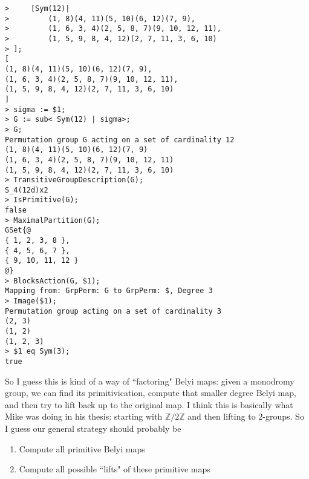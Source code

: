 \documentclass[reqno, 12pt]{amsart}
\theoremstyle{definition}
\theoremstyle{remark}
\newcommand{\Z}{\mathbb Z}
\begin{document}
\begin{lstlisting}
>     [Sym(12)|
>         (1, 8)(4, 11)(5, 10)(6, 12)(7, 9),
>         (1, 6, 3, 4)(2, 5, 8, 7)(9, 10, 12, 11),
>         (1, 5, 9, 8, 4, 12)(2, 7, 11, 3, 6, 10)
> ];
[
(1, 8)(4, 11)(5, 10)(6, 12)(7, 9),
(1, 6, 3, 4)(2, 5, 8, 7)(9, 10, 12, 11),
(1, 5, 9, 8, 4, 12)(2, 7, 11, 3, 6, 10)
]
> sigma := $1;
> G := sub< Sym(12) | sigma>;
> G;
Permutation group G acting on a set of cardinality 12
(1, 8)(4, 11)(5, 10)(6, 12)(7, 9)
(1, 6, 3, 4)(2, 5, 8, 7)(9, 10, 12, 11)
(1, 5, 9, 8, 4, 12)(2, 7, 11, 3, 6, 10)
> TransitiveGroupDescription(G);
S_4(12d)x2
> IsPrimitive(G);
false
> MaximalPartition(G);
GSet{@
{ 1, 2, 3, 8 },
{ 4, 5, 6, 7 },
{ 9, 10, 11, 12 }
@}
> BlocksAction(G, $1);
Mapping from: GrpPerm: G to GrpPerm: $, Degree 3
> Image($1);
Permutation group acting on a set of cardinality 3
(2, 3)
(1, 2)
(1, 2, 3)
> $1 eq Sym(3);
true
\end{lstlisting}

So I guess this is kind of a way of ``factoring" Belyi maps: given a monodromy group, we can find its primitivication, compute that smaller degree Belyi map, and then try to lift back up to the original map. I think this is basically what Mike was doing in his thesis: starting with $\Z/2\Z$ and then lifting to $2$-groups. So I guess our general strategy should probably be
\begin{enumerate}
  \item
    Compute all primitive Belyi maps
  \item
    Compute all possible ``lifts" of these primitive maps
\end{enumerate}
\end{document}
